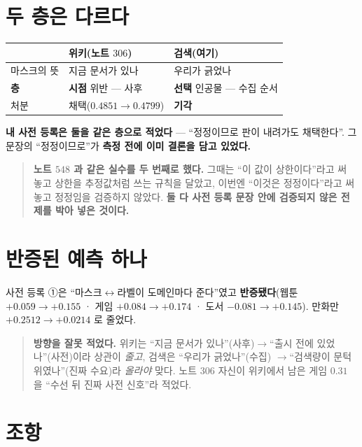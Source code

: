 \documentclass[11pt]{article}
\begin{document}
\section{두 층은 다르다}

\begin{center}
\begin{tabular}{lll}
\hline
 & 위키(노트 $306$) & 검색(여기) \\
\hline
마스크의 뜻 & 지금 문서가 있나 & 우리가 긁었나 \\
\textbf{층} & \textbf{시점} 위반 --- 사후 & \textbf{선택} 인공물 --- 수집 순서 \\
처분 & 채택($0.4851 \to 0.4799$) & \textbf{기각} \\
\hline
\end{tabular}
\end{center}

\textbf{내 사전 등록은 둘을 같은 층으로 적었다} --- ``정정이므로 판이
내려가도 채택한다''. 그 문장의 ``정정이므로''가 \textbf{측정 전에 이미
결론을 담고 있었다.}

\begin{quote}
\textbf{노트 $548$ 과 같은 실수를 두 번째로 했다.} 그때는 ``이 값이
상한이다''라고 써 놓고 상한을 추정값처럼 쓰는 규칙을 달았고, 이번엔 ``이것은
정정이다''라고 써 놓고 정정임을 검증하지 않았다. \textbf{둘 다 사전 등록
문장 안에 검증되지 않은 전제를 박아 넣은 것이다.}
\end{quote}

\section*{반증된 예측 하나}

사전 등록 ①은 ``마스크$\leftrightarrow$라벨이 도메인마다 준다''였고
\textbf{반증됐다}(웹툰 $+0.059 \to +0.155$ · 게임 $+0.084 \to +0.174$ ·
도서 $-0.081 \to +0.145$). 만화만 $+0.2512 \to +0.0214$ 로 줄었다.

\begin{quote}
\textbf{방향을 잘못 적었다.} 위키는 ``지금 문서가 있나''(사후)$\to$``출시
전에 있었나''(사전)이라 상관이 \emph{줄고}, 검색은 ``우리가 긁었나''(수집)
$\to$``검색량이 문턱 위였나''(진짜 수요)라 \emph{올라야} 맞다. 노트 $306$
자신이 위키에서 남은 게임 $0.31$ 을 ``수선 뒤 진짜 사전 신호''라 적었다.
\end{quote}

\section*{조항}
\end{document}
